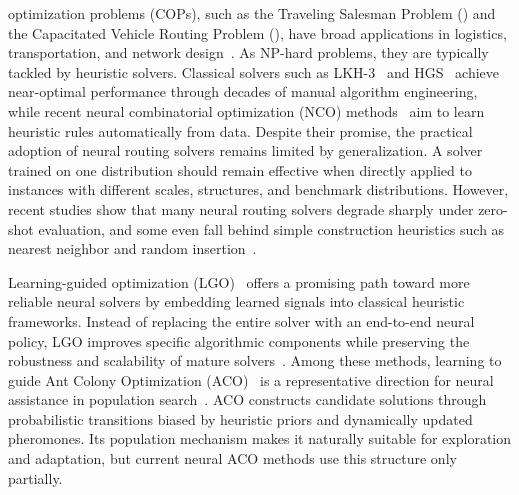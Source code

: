 
 optimization problems (COPs), such as the Traveling Salesman Problem (\TSP{}) and the Capacitated Vehicle Routing Problem (\CVRP{}), have broad applications in logistics, transportation, and network design~\cite{TSPAPP}. As NP-hard problems, they are typically tackled by heuristic solvers. Classical solvers such as LKH-3~\cite{lkhtsp,lkhcvrp} and HGS~\cite{hgs} achieve near-optimal performance through decades of manual algorithm engineering, while recent neural combinatorial optimization (NCO) methods~\cite{MLCO,RL4CO,neuopt,2optlearning} aim to learn heuristic rules automatically from data. Despite their promise, the practical adoption of neural routing solvers remains limited by generalization. A solver trained on one distribution should remain effective when directly applied to instances with different scales, structures, and benchmark distributions. However, recent studies show that many neural routing solvers degrade sharply under zero-shot evaluation, and some even fall behind simple construction heuristics such as nearest neighbor and random insertion~\cite{nrs_survey}.

Learning-guided optimization (LGO)~\cite{learn2branch,learn2delegate,neurolkh} offers a promising path toward more reliable neural solvers by embedding learned signals into classical heuristic frameworks. Instead of replacing the entire solver with an end-to-end neural policy, LGO improves specific algorithmic components while preserving the robustness and scalability of mature solvers~\cite{learn2delegate,deepaco,learn2seg,huang2024contrastive}. Among these methods, learning to guide Ant Colony Optimization (ACO)~\cite{ACO,maxmin} is a representative direction for neural assistance in population search~\cite{deepaco,gtgaco}. ACO constructs candidate solutions through probabilistic transitions biased by heuristic priors and dynamically updated pheromones. Its population mechanism makes it naturally suitable for exploration and adaptation, but current neural ACO methods use this structure only partially.

